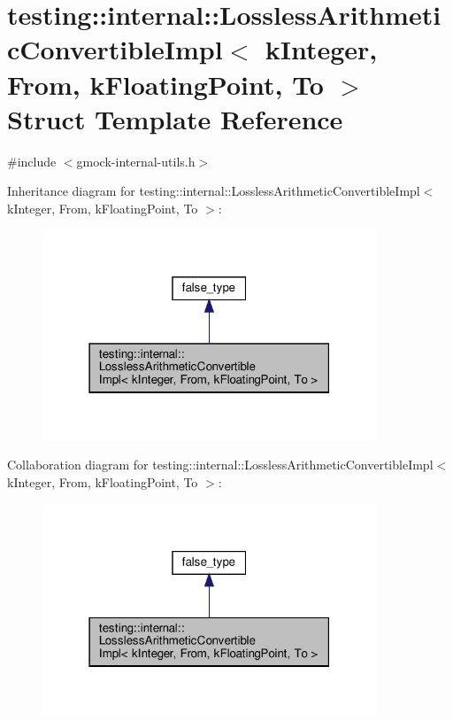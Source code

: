 \hypertarget{structtesting_1_1internal_1_1_lossless_arithmetic_convertible_impl_3_01k_integer_00_01_from_00_01k_floating_point_00_01_to_01_4}{}\section{testing\+:\+:internal\+:\+:Lossless\+Arithmetic\+Convertible\+Impl$<$ k\+Integer, From, k\+Floating\+Point, To $>$ Struct Template Reference}
\label{structtesting_1_1internal_1_1_lossless_arithmetic_convertible_impl_3_01k_integer_00_01_from_00_01k_floating_point_00_01_to_01_4}


{\ttfamily \#include $<$gmock-\/internal-\/utils.\+h$>$}



Inheritance diagram for testing\+:\+:internal\+:\+:Lossless\+Arithmetic\+Convertible\+Impl$<$ k\+Integer, From, k\+Floating\+Point, To $>$\+:
\nopagebreak
\begin{figure}[H]
\begin{center}
\leavevmode
\includegraphics[width=283pt]{structtesting_1_1internal_1_1_lossless_arithmetic_convertible_impl_3_01k_integer_00_01_from_00_06d9ce66e506577c5cac86f092102e7fa}
\end{center}
\end{figure}


Collaboration diagram for testing\+:\+:internal\+:\+:Lossless\+Arithmetic\+Convertible\+Impl$<$ k\+Integer, From, k\+Floating\+Point, To $>$\+:
\nopagebreak
\begin{figure}[H]
\begin{center}
\leavevmode
\includegraphics[width=283pt]{structtesting_1_1internal_1_1_lossless_arithmetic_convertible_impl_3_01k_integer_00_01_from_00_0ce0fe9edf40204219c5560047460cede}
\end{center}
\end{figure}
